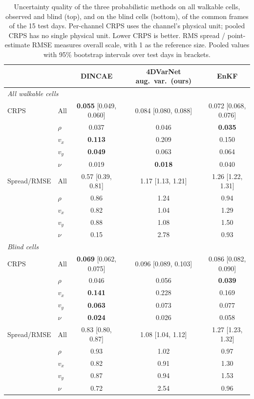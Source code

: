 \documentclass[english, 12pt, a4paper, elec, utf8, a-2b, online]{aaltothesis}
\begin{document}
\begin{table}[htb]
	\centering
	\caption{Uncertainty quality of the three probabilistic methods on all
	walkable cells, observed and blind (top), and on the blind cells (bottom),
	of the common frames of the 15 test days. Per-channel CRPS uses
the channel's physical unit; pooled CRPS has no single physical unit.
Lower CRPS is better. RMS spread / point-estimate RMSE measures overall scale,
with 1 as the reference size. Pooled values with 95\% bootstrap intervals over test days in
	brackets.}
	\label{tab:uncertainty}
	\small
	\setlength{\tabcolsep}{3pt}
	\begin{tabular}{llccc}
		\hline
		& & DINCAE & 4DVarNet aug.\ var.\ (ours) & EnKF \\
		\hline
		\multicolumn{5}{l}{\emph{All walkable cells}} \\
		CRPS        & All    & \textbf{0.055} {\small [0.049, 0.060]} & 0.084 {\small [0.080, 0.088]} & 0.072 {\small [0.068, 0.076]} \\
		            & $\rho$ & 0.037 & 0.046 & \textbf{0.035} \\
		            & $v_x$  & \textbf{0.113} & 0.209 & 0.150 \\
		            & $v_y$  & \textbf{0.049} & 0.063 & 0.064 \\
		            & $\nu$  & 0.019 & \textbf{0.018} & 0.040 \\
		\hline
		Spread/RMSE & All    & 0.57 {\small [0.39, 0.81]} & 1.17 {\small [1.13, 1.21]} & 1.26 {\small [1.22, 1.31]} \\
		            & $\rho$ & 0.86 & 1.24 & 0.94 \\
		            & $v_x$  & 0.82 & 1.04 & 1.29 \\
		            & $v_y$  & 0.88 & 1.08 & 1.50 \\
		            & $\nu$  & 0.15 & 2.78 & 0.93 \\
		\hline
		\multicolumn{5}{l}{\emph{Blind cells}} \\
		CRPS        & All    & \textbf{0.069} {\small [0.062, 0.075]} & 0.096 {\small [0.089, 0.103]} & 0.086 {\small [0.082, 0.090]} \\
		            & $\rho$ & 0.046 & 0.056 & \textbf{0.039} \\
		            & $v_x$  & \textbf{0.141} & 0.228 & 0.169 \\
		            & $v_y$  & \textbf{0.063} & 0.073 & 0.077 \\
		            & $\nu$  & \textbf{0.024} & 0.026 & 0.058 \\
		\hline
		Spread/RMSE & All    & 0.83 {\small [0.80, 0.87]} & 1.08 {\small [1.04, 1.12]} & 1.27 {\small [1.23, 1.32]} \\
		            & $\rho$ & 0.93 & 1.02 & 0.97 \\
		            & $v_x$  & 0.82 & 0.91 & 1.30 \\
		            & $v_y$  & 0.87 & 0.94 & 1.53 \\
		            & $\nu$  & 0.72 & 2.54 & 0.96 \\
		\hline
	\end{tabular}
\end{table}
\end{document}
